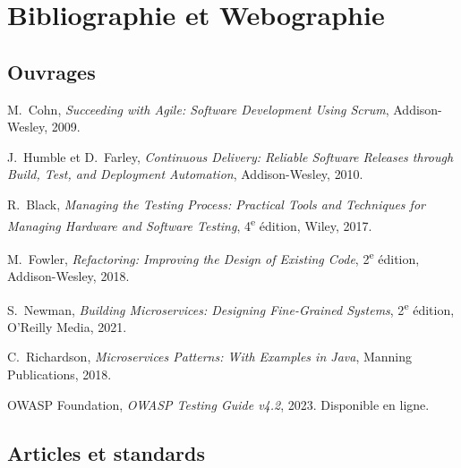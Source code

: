 \chapter*{Bibliographie et Webographie}

\section*{Ouvrages}

\begin{enumerate}[label={[\arabic*]}, leftmargin=2cm]

\item \label{bib:cohn} M.~Cohn, \textit{Succeeding with Agile: Software
  Development Using Scrum}, Addison-Wesley, 2009.

\item \label{bib:humble} J.~Humble et D.~Farley, \textit{Continuous Delivery:
  Reliable Software Releases through Build, Test, and Deployment Automation},
  Addison-Wesley, 2010.

\item \label{bib:black} R.~Black, \textit{Managing the Testing Process:
  Practical Tools and Techniques for Managing Hardware and Software Testing},
  4\textsuperscript{e} édition, Wiley, 2017.

\item \label{bib:fowler} M.~Fowler, \textit{Refactoring: Improving the Design
  of Existing Code}, 2\textsuperscript{e} édition, Addison-Wesley, 2018.

\item \label{bib:newman} S.~Newman, \textit{Building Microservices: Designing
  Fine-Grained Systems}, 2\textsuperscript{e} édition, O'Reilly Media, 2021.

\item \label{bib:richardson} C.~Richardson, \textit{Microservices Patterns: With
  Examples in Java}, Manning Publications, 2018.

\item \label{bib:owasp} OWASP Foundation, \textit{OWASP Testing Guide v4.2},
  2023. Disponible en ligne.

\end{enumerate}

\section*{Articles et standards}

